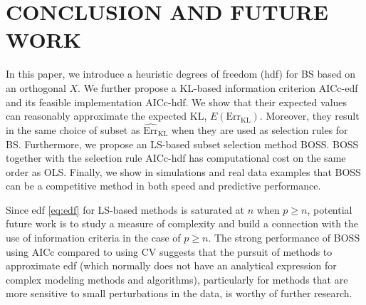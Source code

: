 \section{CONCLUSION AND FUTURE WORK}
\label{sec:conclusion}
In this paper, we introduce a heuristic degrees of freedom (hdf) for BS based on an orthogonal $X$. We further propose a KL-based information criterion AICc-edf and its feasible implementation AICc-hdf. We show that their expected values can reasonably approximate the expected KL, $E(\text{Err}_\text{KL})$. Moreover, they result in the same choice of subset as $\widehat{\text{Err}}_{\text{KL}}$  when they are used as selection rules for BS. Furthermore, we propose an LS-based subset selection method BOSS. BOSS together with the selection rule AICc-hdf has computational cost on the same order as OLS. Finally, we show in simulations and real data examples that BOSS can be a competitive method in both speed and predictive performance. 

Since edf \eqref{eq:edf} for LS-based methods is saturated at $n$ when $p\ge n$, potential future work is to study a measure of complexity and build a connection with the use of information criteria in the case of $p \ge n$. The strong performance of BOSS using AICc compared to using CV suggests that the pursuit of methods to approximate edf (which normally does not have an analytical expression for complex modeling methods and algorithms), particularly for methods that are more sensitive to small perturbations in the data, is worthy of further research.